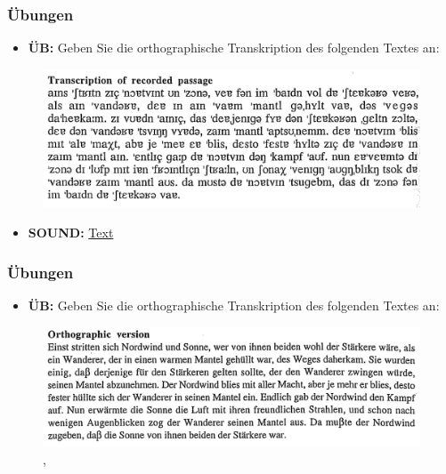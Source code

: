 
\begin{frame}
\frametitle{Übungen}

	\begin{itemize}
		\item \textbf{ÜB:} Geben Sie die orthographische Transkription des folgenden Textes an:		
	\end{itemize}
	
	\begin{figure}[H]
		\includegraphics[scale=0.22]{material/04einststrittentranspompino}		
	\end{figure}
	
	\begin{itemize}
		\item \textbf{SOUND:} \href{run:material/04einststrittenaudio/04einststritten.wpl}{Text}
	\end{itemize}

	
\end{frame}



\begin{frame}
\frametitle{Übungen}

	\begin{itemize}
		\item \textbf{ÜB:} Geben Sie die orthographische Transkription des folgenden Textes an:		
	\end{itemize}
	
	\begin{figure}[H]
		\centering
		
		\includegraphics[scale=0.22]{material/04einststrittenorthopompino}
		\caption{\citep{Pompino95a}, \citep{Kohler99a}}
	\end{figure}	
		
\end{frame}


